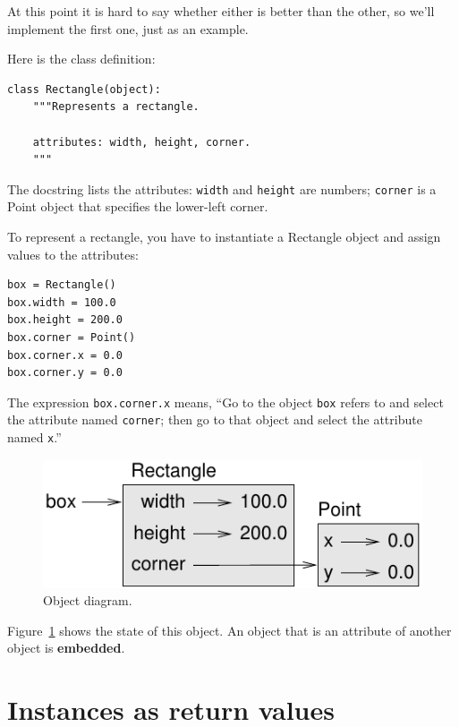 \documentclass[10pt]{book}
\begin{document}
At this point it is hard to say whether either is better than
the other, so we'll implement the first one, just as an example.

Here is the class definition:

\begin{verbatim}
class Rectangle(object):
    """Represents a rectangle.

    attributes: width, height, corner.
    """
\end{verbatim}
%
The docstring lists the attributes:  {\tt width} and
{\tt height} are numbers; {\tt corner} is a Point object that
specifies the lower-left corner.

To represent a rectangle, you have to instantiate a Rectangle
object and assign values to the attributes:

\begin{verbatim}
box = Rectangle()
box.width = 100.0
box.height = 200.0
box.corner = Point()
box.corner.x = 0.0
box.corner.y = 0.0
\end{verbatim}
%
The expression {\tt box.corner.x} means,
``Go to the object {\tt box} refers to and select the attribute named
{\tt corner}; then go to that object and select the attribute named
{\tt x}.''

\begin{figure}
\centerline
{\includegraphics[scale=0.8]{figs/rectangle.pdf}}
\caption{Object diagram.}
\label{fig.rectangle}
\end{figure}


Figure~\ref{fig.rectangle} shows the state of this object.
An object that is an attribute of another object is {\bf embedded}.


\section{Instances as return values}
\end{document}
